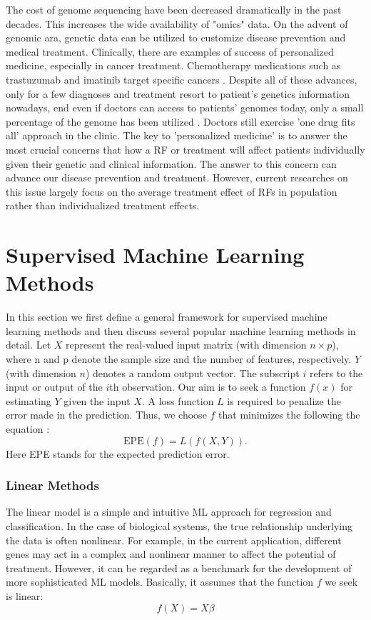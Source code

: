     The cost of genome sequencing have been decreased dramatically in the past decades. This increases the wide availability of "omics" data. On the advent of genomic ara, genetic data can be utilized to customize disease prevention and medical treatment.  Clinically, there are examples of success of personalized medicine, especially in cancer treatment. Chemotherapy medications such as trastuzumab and imatinib target specific cancers \cite{gambacorti2008part}. Despite all of these advances, only for a few diagnoses and treatment resort to patient's genetics information nowadays, end even if doctors can access to patients' genomes today, only a small percentage of the genome has been utilized \cite{yngvadottir2009promise}. Doctors still exercise 'one drug fits all' approach in the clinic. The key to 'personalized medicine' is to answer the most crucial concerns that how a RF or treatment will affect patients individually given their genetic and clinical information. The answer to this concern can advance our disease prevention and treatment. However, current researches on this issue largely focus on the average treatment effect of RFs in population rather than individualized treatment effects.
  
  \section{Supervised Machine Learning Methods}
    In this section we first define a general framework for supervised machine learning methods and then discuss several popular machine learning methods in detail. Let $X$ represent the real-valued input matrix (with dimension $n \times p$), where n and p denote the sample size and the number of features, respectively. $Y$ (with dimension $n$) denotes a random output vector. The subscript $i$ refers to the input or output of the $i$th observation. Our aim is to seek a function $f(x)$ for estimating $Y$ given the input $X$. A loss function $L$ is required to penalize the error made in the prediction. Thus, we choose $f$ that minimizes the following the equation \cite{friedman2001elements}:
    \begin{equation}
      \mathrm{EPE} (f) = \mathit{L}(f(X, Y)).
    \end{equation}
    Here EPE stands for the expected prediction error.

    \subsubsection{Linear Methods}
      The linear model is a simple and intuitive ML approach for regression and classification. In the case of biological systems, the true relationship underlying the data is often nonlinear. For example, in the current application, different genes may act in a complex and nonlinear manner to affect the potential of treatment. However, it can be regarded as a benchmark for the development of more sophisticated ML models. Basically, it assumes that the function $f$ we seek is linear:
      \begin{equation}
        f(X) = X \beta
      \end{equation}

